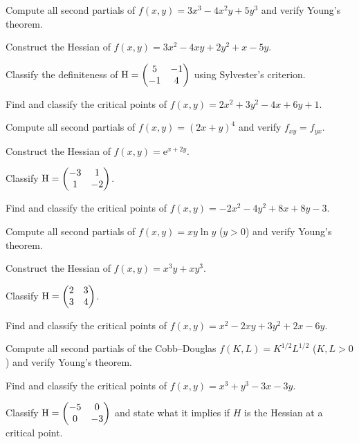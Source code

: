 \begin{problems}
  \item Compute all second partials of $f(x,y) = 3x^{3} - 4x^{2}y + 5y^{3}$
        and verify Young's theorem.
  \item Construct the Hessian of
        $f(x,y) = 3x^{2} - 4xy + 2y^{2} + x - 5y$.
  \item Classify the definiteness of
        $\operatorname{H} = \begin{pmatrix}5&-1\\-1&4\end{pmatrix}$ using Sylvester's
        criterion.
  \item Find and classify the critical points of
        $f(x,y) = 2x^{2} + 3y^{2} - 4x + 6y + 1$.
  \item Compute all second partials of $f(x,y) = (2x+y)^{4}$ and verify
        $f_{xy} = f_{yx}$.
  \item Construct the Hessian of $f(x,y) = \mathrm{e}^{x+2y}$.
  \item Classify $\operatorname{H} = \begin{pmatrix}-3&1\\1&-2\end{pmatrix}$.
  \item Find and classify the critical points of
        $f(x,y) = -2x^{2} - 4y^{2} + 8x + 8y - 3$.
  \item Compute all second partials of $f(x,y) = xy\ln y$ ($y>0$) and
        verify Young's theorem.
  \item Construct the Hessian of $f(x,y) = x^{3}y + xy^{3}$.
  \item Classify $\operatorname{H} = \begin{pmatrix}2&3\\3&4\end{pmatrix}$.
  \item Find and classify the critical points of
        $f(x,y) = x^{2} - 2xy + 3y^{2} + 2x - 6y$.
  \item Compute all second partials of the Cobb--Douglas
        $f(K,L) = K^{1/2}L^{1/2}$ ($K,L>0$) and verify Young's theorem.
  \item Find and classify the critical points of
        $f(x,y) = x^{3} + y^{3} - 3x - 3y$.
  \item Classify $\operatorname{H} = \begin{pmatrix}-5&0\\0&-3\end{pmatrix}$ and state
        what it implies if $H$ is the Hessian at a critical point.
\end{problems}

